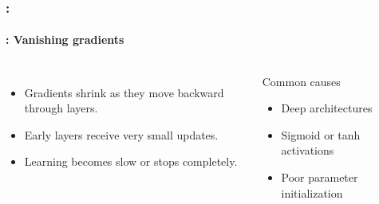 \documentclass[xcolor=table]{beamer}
\begin{document}
\begin{frame}
	\frametitle{\insertshortsubtitle: \insertsection}
	\framesubtitle{\insertsubsection: Vanishing gradients}
	
	\begin{columns}
		
		
		\begin{itemize}
			\item Gradients shrink as they move backward through layers.
			\item Early layers receive very small updates.
			\item Learning becomes slow or stops completely.
		\end{itemize}
		
		\vspace{0.3cm}
		
		\begin{block}{Common causes}
			\begin{itemize}
				\item Deep architectures
				\item Sigmoid or tanh activations
				\item Poor parameter initialization
			\end{itemize}
		\end{block}
		
		
		\begin{center}
		\end{center}
		
	\end{columns}
	
\end{frame}
\end{document}
